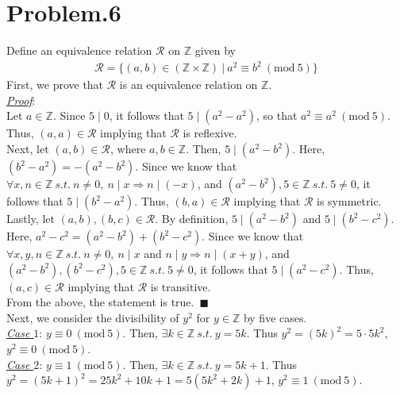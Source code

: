 \documentclass[12pt]{article}
\begin{document}
\section*{Problem.6}
Define an equivalence relation $\mathcal{R}$ on $\mathbb{Z}$ given by
\begin{gather*}
\mathcal{R} = \{ (a,b) \in (\mathbb{Z} \times \mathbb{Z}) ~|~ a^2 \equiv b^2 ~\left(\mathrm{mod}~5\right) \}
\end{gather*}
First, we prove that $\mathcal{R}$ is an equivalence relation on $\mathbb{Z}$.\\[1em]
\underline{\textit{Proof}}: \\[1em]
Let $a \in \mathbb{Z}$. Since $5 \mid 0$, it follows that $5 \mid \left( a^2 - a^2 \right)$, so that $a^2 \equiv a^2 ~\left(\mathrm{mod}~5\right).$ Thus, $(a,a) \in \mathcal{R}$ implying that $\mathcal{R}$ is reflexive.\\[1em]
Next, let $(a,b) \in \mathcal{R}$, where $a, b \in \mathbb{Z}$. Then, $5 \mid \left( a^2 - b^2 \right)$. Here, $\left( b^2 - a^2 \right) = - \left( a^2 - b^2 \right)$. Since we know that $\forall x, n \in \mathbb{Z} ~s.t.~ n \neq 0,~ n \mid x \Rightarrow n \mid (-x)$, and $\left( a^2 - b^2 \right), 5 \in \mathbb{Z} ~s.t.~ 5 \neq 0$, it follows that $5 \mid \left( b^2 - a^2 \right)$. Thus, $(b,a) \in \mathcal{R}$ implying that $\mathcal{R}$ is symmetric.\\[1em]
Lastly, let $(a, b), (b, c) \in \mathcal{R}$. By definition,  $5 \mid \left( a^2 - b^2 \right)$ and $5 \mid \left( b^2 - c^2 \right)$. Here, $a^2 - c^2 = \left( a^2 - b^2\right) + \left( b^2 - c^2\right)$.  Since we know that $\forall x, y, n \in \mathbb{Z} ~s.t.~ n \neq 0,~ n \mid x$ and $n \mid y \Rightarrow n \mid (x + y)$, and $\left( a^2 - b^2 \right), \left( b^2 - c^2 \right), 5 \in \mathbb{Z} ~s.t.~ 5 \neq 0$, it follows that $5 \mid \left( a^2 - c^2 \right)$. Thus, $(a,c) \in \mathcal{R}$ implying that $\mathcal{R}$ is transitive.\\[1em]
From the above, the statement is true.~$\blacksquare$\\[1em]
Next, we consider the divisibility of $y^2$ for $y \in \mathbb{Z}$ by five cases.\\
\underline{\textit{Case $1$}}: $y \equiv 0 ~\left(\mathrm{mod}~5\right)$. Then, $\exists k \in \mathbb{Z} ~s.t.~ y = 5k$. Thus $y^2 = \left(5k\right)^2 = 5 \cdot 5 k^2$, $y^2 \equiv 0 ~\left(\mathrm{mod}~5\right)$. \\[1em]
\underline{\textit{Case $2$}}: $y \equiv 1 ~\left(\mathrm{mod}~5\right)$. Then, $\exists k \in \mathbb{Z} ~s.t.~ y = 5k + 1$. Thus $y^2 = \left(5k + 1\right)^2 = 25k^2 + 10k + 1 = 5 \left( 5 k^2 + 2 k \right) + 1$, $y^2 \equiv 1 ~\left(\mathrm{mod}~5\right)$. \\[1em]
\end{document}
